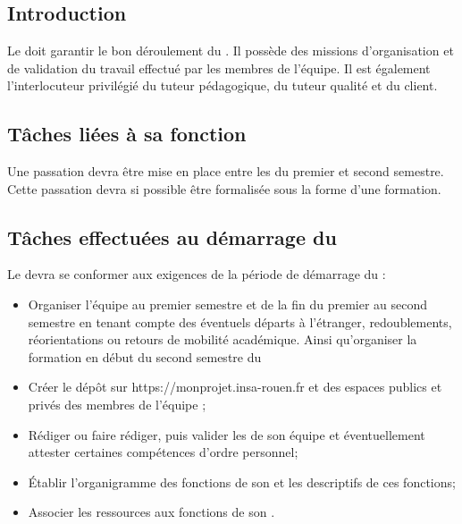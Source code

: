 \section{\CP}
\subsection*{Introduction}


Le \CP{} doit garantir le bon déroulement du \PICCourt. Il possède des missions d’organisation et de validation du travail effectué par les membres de l’équipe. Il est également l’interlocuteur privilégié du tuteur pédagogique, du tuteur qualité et du client.

\subsection*{Tâches liées à sa fonction}

Une passation devra être mise en place entre les \CPs{} du premier et second semestre. Cette passation devra si possible être formalisée sous la forme d’une formation.

\subsection*{Tâches effectuées au démarrage du \PICCourt}

Le \CP{} devra se conformer aux exigences de la période de démarrage du \PICCourt :
\begin{itemize}
	\item Organiser l’équipe \PICCourt au premier semestre et de la fin du premier au second semestre en tenant compte des éventuels départs à l’étranger, redoublements, réorientations ou retours de mobilité académique. Ainsi qu’organiser la formation en début du second semestre du \PICCourt

	\item Créer le dépôt \git{} sur https://monprojet.insa-rouen.fr et des espaces publics et privés des membres de l’équipe \PICCourt ;
	\item Rédiger ou faire rédiger, puis valider les \FC{} de son équipe et éventuellement attester certaines compétences d’ordre personnel;
	\item Établir l’organigramme des fonctions de son \PICCourt et les descriptifs de ces fonctions;
	\item Associer les ressources aux fonctions de son \PICCourt.
\end{itemize}

